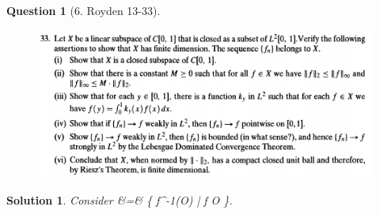 \documentclass{article} %
\def\eQb#1\eQe{\begin{eqnarray*}#1\end{eqnarray*}}
\theoremstyle{quest}
\newtheorem*{question}{Question}
\newtheorem*{solution}{Solution}
\begin{document}
\bigskip

\begin{question}[6. Royden 13-33]
\hfill
\begin{figure}[h!]
  \centering
    \includegraphics[width=1\textwidth]{13-33}
\end{figure}
\end{question}
\begin{solution}
Consider
\eQb
\mathscr{S} &=& \{ f^{-1}(O) \> | \> f  O
  \}.
\eQe

\end{solution}
\end{document}
